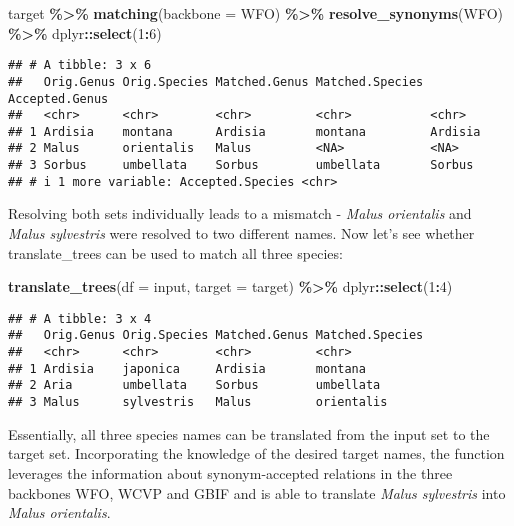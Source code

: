 \documentclass[
  11pt,
]{article}
\newenvironment{Shaded}{\begin{snugshade}}{\end{snugshade}}
\newcommand{\AttributeTok}[1]{\textcolor[rgb]{0.13,0.29,0.53}{#1}}
\newcommand{\DecValTok}[1]{\textcolor[rgb]{0.00,0.00,0.81}{#1}}
\newcommand{\FunctionTok}[1]{\textcolor[rgb]{0.13,0.29,0.53}{\textbf{#1}}}
\newcommand{\NormalTok}[1]{#1}
\newcommand{\SpecialCharTok}[1]{\textcolor[rgb]{0.81,0.36,0.00}{\textbf{#1}}}
\newcommand{\StringTok}[1]{\textcolor[rgb]{0.31,0.60,0.02}{#1}}
\begin{document}
\begin{Shaded}
\begin{Highlighting}[]
\NormalTok{target }\SpecialCharTok{\%\textgreater{}\%}
  \FunctionTok{matching}\NormalTok{(}\AttributeTok{backbone =} \StringTok{\textquotesingle{}WFO\textquotesingle{}}\NormalTok{) }\SpecialCharTok{\%\textgreater{}\%}
  \FunctionTok{resolve\_synonyms}\NormalTok{(}\StringTok{\textquotesingle{}WFO\textquotesingle{}}\NormalTok{) }\SpecialCharTok{\%\textgreater{}\%}
\NormalTok{  dplyr}\SpecialCharTok{::}\FunctionTok{select}\NormalTok{(}\DecValTok{1}\SpecialCharTok{:}\DecValTok{6}\NormalTok{)}
\end{Highlighting}
\end{Shaded}

\begin{verbatim}
## # A tibble: 3 x 6
##   Orig.Genus Orig.Species Matched.Genus Matched.Species Accepted.Genus
##   <chr>      <chr>        <chr>         <chr>           <chr>         
## 1 Ardisia    montana      Ardisia       montana         Ardisia       
## 2 Malus      orientalis   Malus         <NA>            <NA>          
## 3 Sorbus     umbellata    Sorbus        umbellata       Sorbus        
## # i 1 more variable: Accepted.Species <chr>
\end{verbatim}

\normalsize

Resolving both sets individually leads to a mismatch - \emph{Malus
orientalis} and \emph{Malus sylvestris} were resolved to two different
names. Now let's see whether translate\_trees can be used to match all
three species: \small

\begin{Shaded}
\begin{Highlighting}[]
\FunctionTok{translate\_trees}\NormalTok{(}\AttributeTok{df =}\NormalTok{ input, }\AttributeTok{target =}\NormalTok{ target) }\SpecialCharTok{\%\textgreater{}\%} 
\NormalTok{  dplyr}\SpecialCharTok{::}\FunctionTok{select}\NormalTok{(}\DecValTok{1}\SpecialCharTok{:}\DecValTok{4}\NormalTok{) }
\end{Highlighting}
\end{Shaded}

\begin{verbatim}
## # A tibble: 3 x 4
##   Orig.Genus Orig.Species Matched.Genus Matched.Species
##   <chr>      <chr>        <chr>         <chr>          
## 1 Ardisia    japonica     Ardisia       montana        
## 2 Aria       umbellata    Sorbus        umbellata      
## 3 Malus      sylvestris   Malus         orientalis
\end{verbatim}

\normalsize

Essentially, all three species names can be translated from the input
set to the target set. Incorporating the knowledge of the desired target
names, the function leverages the information about synonym-accepted
relations in the three backbones WFO, WCVP and GBIF and is able to
translate \emph{Malus sylvestris} into \emph{Malus orientalis}.
\end{document}
